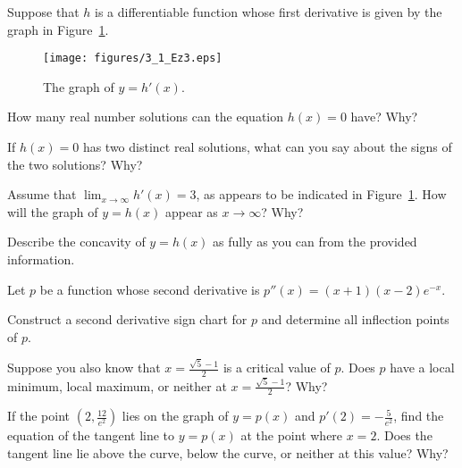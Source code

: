 \begin{exercises}
\item Suppose that $h$ is a differentiable function whose first derivative is given by the graph in Figure~\ref{F:3.1.Ez3}.
\begin{figure}[h]
\begin{center}
\texttt{[image: figures/3\_1\_Ez3.eps]}
\end{center}
\caption{The graph of $y = h'(x)$.} \label{F:3.1.Ez3}
\end{figure}
\ba
	\item How many real number solutions can the equation $h(x) = 0$ have?  Why?
	\item If $h(x) = 0$ has two distinct real solutions, what can you say about the signs of the two solutions?  Why?
	\item Assume that $\lim_{x \to \infty} h'(x) = 3$, as appears to be indicated in Figure~\ref{F:3.1.Ez3}.  How will the graph of $y = h(x)$ appear as $x \to \infty$?  Why?
	\item Describe the concavity of $y = h(x)$ as fully as you can from the provided information.
\ea

\item Let $p$ be a function whose second derivative is $p''(x) = (x+1)(x-2)e^{-x}$.
	\ba
		\item Construct a second derivative sign chart for $p$ and determine all inflection points of $p$.
		\item Suppose you also know that $x = \frac{\sqrt{5}-1}{2}$ is a critical value of $p$.  Does $p$ have a local minimum, local maximum, or neither at $x = \frac{\sqrt{5}-1}{2}$?  Why?
		\item If the point $(2, \frac{12}{e^2})$ lies on the graph of $y = p(x)$ and $p'(2) = -\frac{5}{e^2}$, find the equation of the tangent line to $y = p(x)$ at the point where $x = 2$.  Does the tangent line lie above the curve, below the curve, or neither at this value?  Why?
	\ea
\end{exercises}
\afterexercises